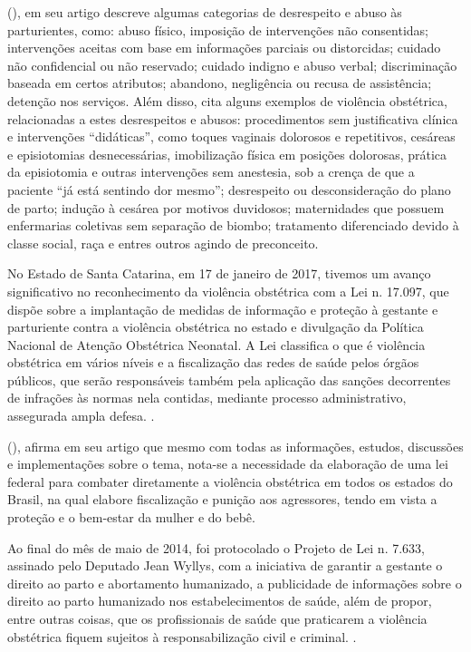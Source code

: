 \citeauthor{diniz2015abuse} (\citeyear{diniz2015abuse}), em seu artigo descreve algumas categorias de desrespeito e abuso às parturientes, como: abuso físico, imposição de intervenções não consentidas; intervenções aceitas com base em informações parciais ou distorcidas; cuidado não confidencial ou não reservado; cuidado indigno e abuso verbal; discriminação baseada em certos atributos; abandono, negligência ou recusa de assistência; detenção nos serviços. Além disso, cita alguns exemplos de violência obstétrica, relacionadas a estes desrespeitos e abusos: procedimentos sem justificativa clínica e intervenções ``didáticas'', como toques vaginais dolorosos e repetitivos, cesáreas e episiotomias desnecessárias, imobilização física em posições dolorosas, prática da episiotomia e outras intervenções sem anestesia, sob a crença de que a paciente ``já está sentindo dor mesmo''; desrespeito ou desconsideração do plano de parto; indução à cesárea por motivos duvidosos; maternidades que possuem enfermarias coletivas sem separação de biombo; tratamento diferenciado devido à classe social, raça e entres outros agindo de preconceito.

No Estado de Santa Catarina, em 17 de janeiro de 2017, tivemos um avanço significativo no reconhecimento da violência obstétrica com a Lei n. 17.097, que dispõe sobre a implantação de medidas de informação e proteção à gestante e parturiente contra a violência obstétrica no estado e divulgação da Política Nacional de Atenção Obstétrica Neonatal. A Lei classifica o que é violência obstétrica em vários níveis e a fiscalização das redes de saúde pelos órgãos públicos, que serão responsáveis também pela aplicação das sanções decorrentes de infrações às normas nela contidas, mediante processo administrativo, assegurada ampla defesa. \cite{soares2017violencia}.

\citeauthor{soares2017violencia} (\citeyear{soares2017violencia}), afirma em seu artigo que mesmo com todas as informações, estudos, discussões e implementações sobre o tema, nota-se a necessidade da elaboração de uma lei federal para combater diretamente a violência obstétrica em todos os estados do Brasil, na qual elabore fiscalização e punição aos agressores, tendo em vista a proteção e o bem-estar da mulher e do bebê. 

\begin{citacao}
Ao final do mês de maio de 2014, foi protocolado o Projeto de Lei n. 7.633, assinado pelo Deputado Jean Wyllys, com a iniciativa de garantir a gestante o direito ao parto e abortamento humanizado, a publicidade de informações sobre o direito ao parto humanizado nos estabelecimentos de saúde, além de propor, entre outras coisas, que os profissionais de saúde que praticarem a violência obstétrica fiquem sujeitos à responsabilização civil e criminal. \cite{soares2017violencia}.
\end{citacao}

